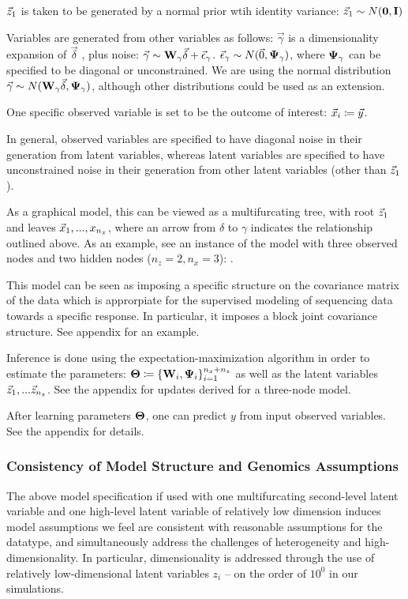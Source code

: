 $\vec{z}_1$ is taken to be generated by a normal prior wtih identity variance: $\vec{z}_1 \sim N(\mathbf{0}, \mathbf{I})$

Variables are generated from other variables as follows: ${\vec{\gamma}}$ is a dimensionality expansion of $\vec{\delta}$ , plus noise:  $\vec{\gamma} \sim \bold{W} _\gamma \vec{\delta} + \vec{\epsilon}_\gamma$. $\vec{\epsilon}_\gamma \sim N(\vec{0} , \bold{\Psi}_\gamma)$, where $\bold{\Psi}_\gamma$ can be specified to be diagonal or unconstrained. We are using the normal distribution $\vec{\gamma} \sim N(\bold{W}_\gamma \vec{\delta}, \bold{\Psi}_\gamma)$, although other distributions could be used as an extension.

One specific observed variable is set to be the outcome of interest: $\vec{x}_i \coloneqq \vec{y}$. 

In general, observed variables are specified to have diagonal noise in their generation from latent variables, whereas latent variables are specified to have unconstrained noise in their generation from other latent variables (other than $\vec{z}_1$). 


As a graphical model, this can be viewed as a multifurcating tree, with root $\vec{z}_1$ and leaves $\vec{x}_1, ..., x_{n_x}$, where an arrow from $\delta$ to $\gamma$ indicates the relationship outlined above. As an example, see an instance of the model with three observed nodes and two hidden nodes ($n_z = 2, n_x = 3$): .


This model can be seen as imposing a specific structure on the covariance matrix of the data which is approrpiate for the supervised modeling of sequencing data towards a specific response. In particular, it imposes a block joint covariance structure. See appendix for an example.  

Inference is done using the expectation-maximization algorithm in order to estimate the parameters: $\bold{\Theta} \coloneqq \left\{\bold{W}_i, \bold{\Psi}_i \right\}_{i=1}^{n_x + n_z}$ as well as the latent variables $\vec{z}_1,... \vec{z}_{n_z}$. See the appendix for updates derived for a three-node model. 


After learning parameters $\bold{\Theta}$, one can predict $y$ from input observed variables. See the appendix for details.

\subsubsection{Consistency of Model Structure and Genomics Assumptions}

The above model specification if used with one multifurcating second-level latent variable and one high-level latent variable of relatively low dimension induces model assumptions we feel are consistent with reasonable assumptions for the datatype, and simultaneously address the challenges of heterogeneity and high-dimensionality. In particular, dimensionality is addressed through the use of relatively low-dimensional latent variables $z_i$ -- on the order of $10^0$ in our simulations.


